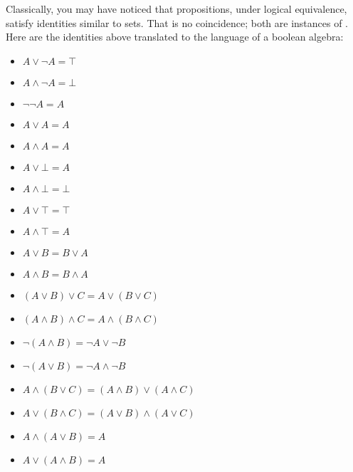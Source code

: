 \documentclass[letterpaper,10pt,english]{sphinxmanual}
\begin{document}
\sphinxAtStartPar
Classically, you may have noticed that propositions, under logical equivalence, satisfy identities similar to sets. That is no coincidence; both are instances of . Here are the identities above translated to the language of a boolean algebra:
\begin{itemize}
\item {} 
\sphinxAtStartPar
\(A \vee \neg A = \top\)

\item {} 
\sphinxAtStartPar
\(A \wedge \neg A = \bot\)

\item {} 
\sphinxAtStartPar
\(\neg \neg A = A\)

\item {} 
\sphinxAtStartPar
\(A \vee A = A\)

\item {} 
\sphinxAtStartPar
\(A \wedge A = A\)

\item {} 
\sphinxAtStartPar
\(A \vee \bot = A\)

\item {} 
\sphinxAtStartPar
\(A \wedge \bot = \bot\)

\item {} 
\sphinxAtStartPar
\(A \vee \top = \top\)

\item {} 
\sphinxAtStartPar
\(A \wedge \top = A\)

\item {} 
\sphinxAtStartPar
\(A \vee B = B \vee A\)

\item {} 
\sphinxAtStartPar
\(A \wedge B = B \wedge A\)

\item {} 
\sphinxAtStartPar
\((A \vee B) \vee C = A \vee (B \vee C)\)

\item {} 
\sphinxAtStartPar
\((A \wedge B) \wedge C = A \wedge (B \wedge C)\)

\item {} 
\sphinxAtStartPar
\(\neg(A \wedge B) = \neg A \vee \neg B\)

\item {} 
\sphinxAtStartPar
\(\neg(A \vee B) = \neg A \wedge \neg B\)

\item {} 
\sphinxAtStartPar
\(A \wedge (B \vee C) = (A \wedge B) \vee (A \wedge C)\)

\item {} 
\sphinxAtStartPar
\(A \vee (B \wedge C) = (A \vee B) \wedge (A \vee C)\)

\item {} 
\sphinxAtStartPar
\(A \wedge (A \vee B) = A\)

\item {} 
\sphinxAtStartPar
\(A \vee (A \wedge B) = A\)

\end{itemize}
\end{document}
